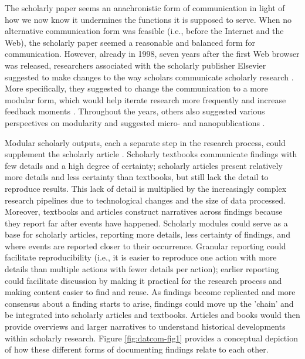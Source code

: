 \documentclass[publications,article,submit,moreauthors,pdftex,10pt,a4paper]{Definitions/mdpi}
\begin{document}
The scholarly paper seems an anachronistic form of communication in
light of how we now know it undermines the functions it is supposed to
serve. When no alternative communication form was feasible (i.e.,
before the Internet and the Web), the scholarly paper seemed a
reasonable and balanced form for communication. However, already in
1998, seven years after the first Web browser was released,
researchers associated with the scholarly publisher Elsevier suggested
to make changes to the way scholars communicate scholarly research
\citep{doi:10.1108/eum0000000007185}. More specifically, they suggested to
change the communication to a more modular form, which would help
iterate research more frequently and increase feedback moments \citep[high
speed of feedback was essential to for example Nature's rise during
the early twentieth century;][]{isbn:9780226261454}. Throughout the
years, others also suggested various perspectives on modularity
\citep{doi:10.3389/fncom.2012.00019,doi:10.7717/peerj-cs.78} and
suggested micro- and nanopublications \citep{doi:10.7717/peerj-cs.78,
doi:10.1186/2041-1480-5-28}.

Modular scholarly outputs, each a separate step in the research
process, could supplement the scholarly article \citep[as detailed in][]{doi:10.3390/publications6020021}. Scholarly textbooks \citep[i.e.,
vademecum science;][]{isbn:9780226253251} communicate findings with few
details and a high degree of certainty; scholarly articles present
relatively more details and less certainty than textbooks, but still
lack the detail to reproduce results. This lack of detail is
multiplied by the increasingly complex research pipelines due to
technological changes and the size of data processed. Moreover,
textbooks and articles construct narratives across findings because
they report far after events have happened. Scholarly modules could
serve as a base for scholarly articles, reporting more details, less
certainty of findings, and where events are reported closer to their
occurrence. Granular reporting could facilitate reproducibility (i.e.,
it is easier to reproduce one action with more details than multiple
actions with fewer details per action); earlier reporting could
facilitate discussion by making it practical for the research process
\citep[extending the idea of Registered Reports;][]{doi:10.1016/j.cortex.2012.12.016} and making content easier to find
and reuse. As findings become replicated and more consensus about a
finding starts to arise, findings could move up the 'chain' and be
integrated into scholarly articles and textbooks. Articles and books
would then provide overviews and larger narratives to understand
historical developments within scholarly research. Figure
\ref{fig:datcom-fig1} provides a conceptual depiction of how these
different forms of documenting findings relate to each other.
\end{document}
